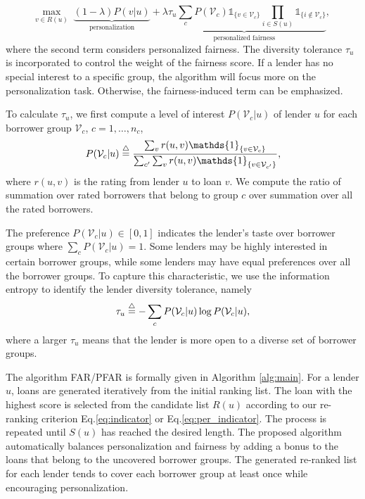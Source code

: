 \begin{equation}
\max_{v\in R(u)}\;\underbrace{(1-\lambda)P(v|u)}_{\text{personalization}} + \underbrace{\lambda\tau_u\sum_{c}P(\mathcal V_c)\mathds{1}_{\{v\in \mathcal V_c\}}\prod_{i\in S(u)}\mathds{1}_{\{i\notin \mathcal V_c\}}}_{\text{personalized fairness}},\; %
\label{eq:per_indicator}
\end{equation}
where the second term considers personalized fairness. The diversity tolerance $\tau_u$ is incorporated to control the weight of the fairness score. If a lender has no special interest to a specific group, the algorithm will focus more on the personalization task. Otherwise, the fairness-induced term can be emphasized.


To calculate $\tau_u$, we first compute a level of interest $P(\mathcal V_c|u)$ of lender $u$ for each borrower group $\mathcal V_c$, $c=1,\ldots,n_c$,
\begin{equation}
P(\mathcal V_c|u)\buildrel\triangle\over=\frac{\sum_vr(u,v)\mathds{1}_{\{v\in \mathcal V_c\}}}{\sum_{c'}\sum_vr(u,v)\mathds{1}_{\{v\in \mathcal V_{c'}\}}},
\end{equation}
where $r(u,v)$ is the rating from lender $u$ to loan $v$. We compute the ratio of summation over rated borrowers that belong to group $c$ over summation over all the rated borrowers. 

The preference $P(\mathcal V_c|u)\in [0,1]$ indicates the lender's taste over borrower groups where $\sum_{c} P(\mathcal V_c|u)=1$. Some lenders may be highly interested in certain borrower groups, while some lenders may have equal preferences over all the borrower groups. To capture this characteristic, we use the information entropy \cite{shannon2001mathematical} to identify the lender diversity tolerance, namely
\begin{equation}
\tau_u\buildrel\triangle\over=-\sum_{c}P(\mathcal V_c|u)\log P(\mathcal V_c|u),
\end{equation}
where a larger $\tau_u$ means that the lender is more open to a diverse set of borrower groups.

The algorithm FAR/PFAR is formally given in Algorithm \ref{alg:main}. For a lender $u$, loans are generated iteratively from the initial ranking list. The loan with the highest score is selected from the candidate list $R(u)$ according to our re-ranking criterion Eq.\eqref{eq:indicator} or Eq.\eqref{eq:per_indicator}. The process is repeated until $S(u)$ has reached the desired length. The proposed algorithm automatically balances personalization and fairness by adding a bonus to the loans that belong to the uncovered borrower groups. The generated re-ranked list for each lender tends to cover each borrower group at least once while encouraging personalization.


